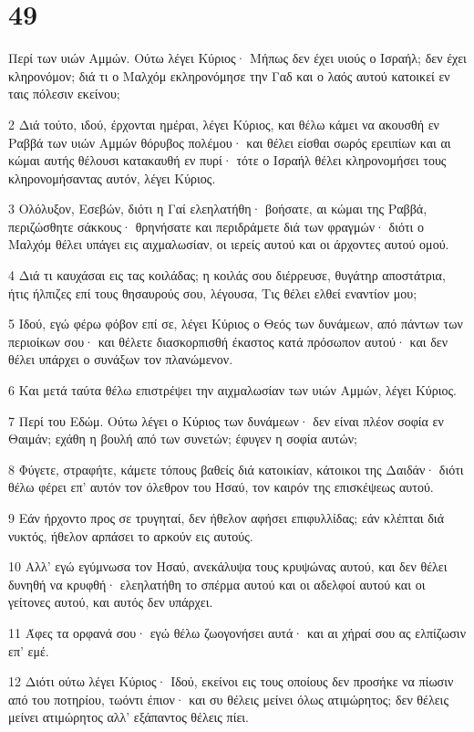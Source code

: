 \chapter{49}

\par Περί των υιών Αμμών. Ούτω λέγει Κύριος· Μήπως δεν έχει υιούς ο Ισραήλ; δεν έχει κληρονόμον; διά τι ο Μαλχόμ εκληρονόμησε την Γαδ και ο λαός αυτού κατοικεί εν ταις πόλεσιν εκείνου;
\par 2 Διά τούτο, ιδού, έρχονται ημέραι, λέγει Κύριος, και θέλω κάμει να ακουσθή εν Ραββά των υιών Αμμών θόρυβος πολέμου· και θέλει είσθαι σωρός ερειπίων και αι κώμαι αυτής θέλουσι κατακαυθή εν πυρί· τότε ο Ισραήλ θέλει κληρονομήσει τους κληρονομήσαντας αυτόν, λέγει Κύριος.
\par 3 Ολόλυξον, Εσεβών, διότι η Γαί ελεηλατήθη· βοήσατε, αι κώμαι της Ραββά, περιζώσθητε σάκκους· θρηνήσατε και περιδράμετε διά των φραγμών· διότι ο Μαλχόμ θέλει υπάγει εις αιχμαλωσίαν, οι ιερείς αυτού και οι άρχοντες αυτού ομού.
\par 4 Διά τι καυχάσαι εις τας κοιλάδας; η κοιλάς σου διέρρευσε, θυγάτηρ αποστάτρια, ήτις ήλπιζες επί τους θησαυρούς σου, λέγουσα, Τις θέλει ελθεί εναντίον μου;
\par 5 Ιδού, εγώ φέρω φόβον επί σε, λέγει Κύριος ο Θεός των δυνάμεων, από πάντων των περιοίκων σου· και θέλετε διασκορπισθή έκαστος κατά πρόσωπον αυτού· και δεν θέλει υπάρχει ο συνάξων τον πλανώμενον.
\par 6 Και μετά ταύτα θέλω επιστρέψει την αιχμαλωσίαν των υιών Αμμών, λέγει Κύριος.
\par 7 Περί του Εδώμ. Ούτω λέγει ο Κύριος των δυνάμεων· δεν είναι πλέον σοφία εν Θαιμάν; εχάθη η βουλή από των συνετών; έφυγεν η σοφία αυτών;
\par 8 Φύγετε, στραφήτε, κάμετε τόπους βαθείς διά κατοικίαν, κάτοικοι της Δαιδάν· διότι θέλω φέρει επ' αυτόν τον όλεθρον του Ησαύ, τον καιρόν της επισκέψεως αυτού.
\par 9 Εάν ήρχοντο προς σε τρυγηταί, δεν ήθελον αφήσει επιφυλλίδας; εάν κλέπται διά νυκτός, ήθελον αρπάσει το αρκούν εις αυτούς.
\par 10 Αλλ' εγώ εγύμνωσα τον Ησαύ, ανεκάλυψα τους κρυψώνας αυτού, και δεν θέλει δυνηθή να κρυφθή· ελεηλατήθη το σπέρμα αυτού και οι αδελφοί αυτού και οι γείτονες αυτού, και αυτός δεν υπάρχει.
\par 11 Άφες τα ορφανά σου· εγώ θέλω ζωογονήσει αυτά· και αι χήραί σου ας ελπίζωσιν επ' εμέ.
\par 12 Διότι ούτω λέγει Κύριος· Ιδού, εκείνοι εις τους οποίους δεν προσήκε να πίωσιν από του ποτηρίου, τωόντι έπιον· και συ θέλεις μείνει όλως ατιμώρητος; δεν θέλεις μείνει ατιμώρητος αλλ' εξάπαντος θέλεις πίει.
